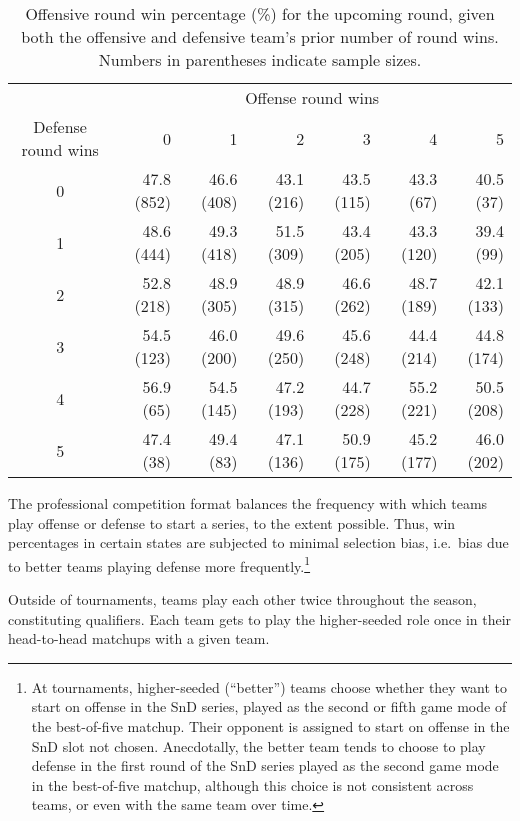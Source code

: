 \documentclass{article}
\begin{document}
\begin{table}

\caption{Offensive round win percentage (\%) for the upcoming round, given both the offensive and defensive team's prior number of round wins. Numbers in parentheses indicate sample sizes.}

\centering
\begin{tabular}{crrrrrr}
\toprule
& \multicolumn{6}{c}{Offense round wins} \\ 
\cmidrule(lr){2-7}
Defense round wins & 0 & 1 & 2 & 3 & 4 & 5 \\ 
\midrule

0 & 47.8 (852) & 46.6 (408) & 43.1 (216) & 43.5 (115) & 43.3 (67)  & 40.5 (37)  \\
1 & 48.6 (444) & 49.3 (418) & 51.5 (309) & 43.4 (205) & 43.3 (120) & 39.4 (99)  \\
2 & 52.8 (218) & 48.9 (305) & 48.9 (315) & 46.6 (262) & 48.7 (189) & 42.1 (133) \\
3 & 54.5 (123) & 46.0 (200) & 49.6 (250) & 45.6 (248) & 44.4 (214) & 44.8 (174) \\
4 & 56.9 (65)  & 54.5 (145) & 47.2 (193) & 44.7 (228) & 55.2 (221) & 50.5 (208) \\
5 & 47.4 (38)  & 49.4 (83)  & 47.1 (136) & 50.9 (175) & 45.2 (177) & 46.0 (202) \\

\bottomrule
\end{tabular}

\label{tbl:o-win-prop-by-series-state}

\end{table}

The professional competition format balances the frequency with which
teams play offense or defense to start a series, to the extent possible.
Thus, win percentages in certain states are subjected to minimal
selection bias, i.e.~bias due to better teams playing defense more
frequently.\footnote{At tournaments, higher-seeded (``better'') teams
  choose whether they want to start on offense in the SnD series, played
  as the second or fifth game mode of the best-of-five matchup. Their
  opponent is assigned to start on offense in the SnD slot not chosen.
  Anecdotally, the better team tends to choose to play defense in the
  first round of the SnD series played as the second game mode in the
  best-of-five matchup, although this choice is not consistent across
  teams, or even with the same team over time.}

Outside of tournaments, teams play each other twice throughout the
season, constituting qualifiers. Each team gets to play the
higher-seeded role once in their head-to-head matchups with a given
team.
\end{document}
